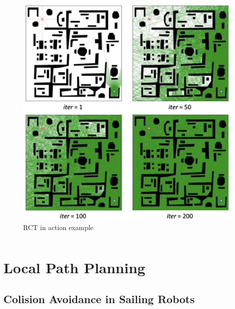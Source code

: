 \documentclass[
    11pt, %
    aspectratio=169, %
]{beamer}
\begin{document}
\begin{frame}
\begin{columns}
\begin{column}{0.5\textwidth}
\begin{figure}
                \includegraphics[scale=0.3]{assets/rct-example.png}
                \caption{RCT in action example}
            \end{figure}
        \end{column}
    \end{columns}

\end{frame}

\section{Local Path Planning}

\subsection{Colision Avoidance in Sailing Robots}
\end{document}

